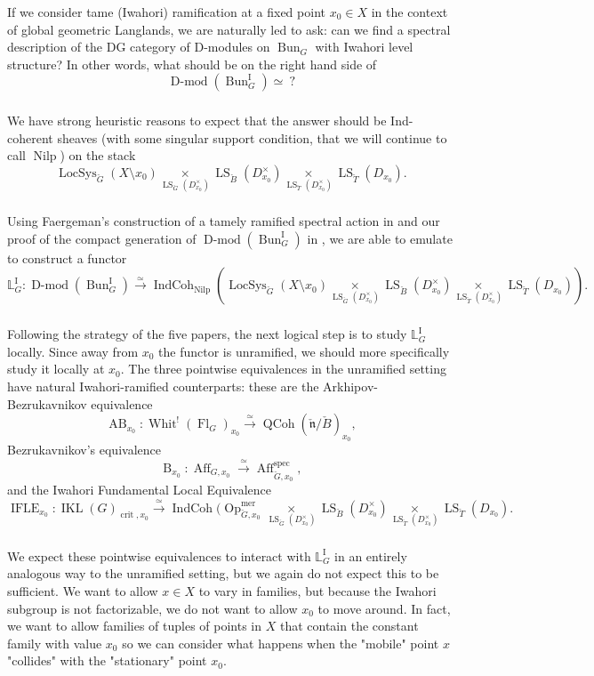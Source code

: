\documentclass[10pt]{amsart}
\theoremstyle{remark}
\newcommand{\on}[1]{\operatorname{#1}}
\newcommand{\Bun}{\on{Bun}}
\newcommand{\Dmod}{\on{D-mod}}
\newcommand{\QCoh}{\on{QCoh}}
\newcommand{\IndCoh}{\on{IndCoh}}
\newcommand{\IKLx}{\on{IKL}(G)_{\on{crit}, x_0}}
\newcommand{\Gcheck}{\check{G}}
\newcommand{\ncheck}{\check{\mathfrak{n}}}
\newcommand{\Bcheck}{\check{B}}
\newcommand{\Tcheck}{\check{T}}
\newcommand{\sssec}[1]{\subsubsection{}}
\begin{document}
\sssec{}
If we consider tame (Iwahori) ramification at a fixed point $x_0 \in X$ in the context of global geometric Langlands, we are naturally led to ask: can we find a spectral description of the DG category of D-modules on $\Bun_G$ with Iwahori level structure? In other words, what should be on the right hand side of 
$$
\Dmod(\Bun_G^{\on{I}}) \simeq \ ?
$$

\sssec{}
We have strong heuristic reasons to expect that the answer should be Ind-coherent sheaves (with some singular support condition, that we will continue to call $\on{Nilp}$) on the stack
$$
\on{LocSys}_{\Gcheck}(X \setminus x_0) \underset{\on{LS}_{\Gcheck}(D_{x_0}^{\times})}{\times} \on{LS}_{\Bcheck}(D_{x_0}^{\times}) \underset{\on{LS}_{\Tcheck}(D_{x_0}^{\times})}{\times} \on{LS}_{\Tcheck}(D_{x_0}).
$$

\sssec{}
Using Faergeman's construction of a tamely ramified spectral action in \cite{Fae} and our proof of the compact generation of $\Dmod(\Bun_G^{\on{I}})$ in \cite{Nam}, we are able to emulate \cite{GLC1} to construct a functor
$$
\mathbb{L}_G^{\on{I}} : \Dmod(\Bun_G^{\on{I}}) \overset{\simeq}{\longrightarrow} \IndCoh_{\on{Nilp}}(\on{LocSys}_{\Gcheck}(X \setminus x_0) \underset{\on{LS}_{\Gcheck}(D_{x_0}^{\times})}{\times} \on{LS}_{\Bcheck}(D_{x_0}^{\times}) \underset{\on{LS}_{\Tcheck}(D_{x_0}^{\times})}{\times} \on{LS}_{\Tcheck}(D_{x_0})).
$$

\sssec{}
Following the strategy of the five papers, the next logical step is to study $\mathbb{L}_G^{\on{I}}$ locally. Since away from $x_0$ the functor is unramified, we should more specifically study it locally at $x_0$. The three pointwise equivalences in the unramified setting have natural Iwahori-ramified counterparts:
these are the Arkhipov-Bezrukavnikov equivalence
$$
\on{AB}_{x_0} : \on{Whit}^!(\on{Fl}_G)_{x_0} \overset{\simeq}{\longrightarrow} \QCoh(\ncheck/\Bcheck)_{x_0},
$$
Bezrukavnikov's equivalence
$$
\on{B}_{x_0} : \on{Aff}_{G, x_0} \overset{\simeq}{\longrightarrow} \on{Aff}_{\Gcheck, x_0}^{\on{spec}},
$$
and the Iwahori Fundamental Local Equivalence
$$
\on{IFLE}_{x_0} : \IKLx \overset{\simeq}{\longrightarrow} \IndCoh(\on{Op}_{\Gcheck, x_0}^{\on{mer}} \underset{\on{LS}_{\Gcheck}(D_{x_0}^{\times})}{\times} \on{LS}_{\Bcheck}(D_{x_0}^{\times}) \underset{\on{LS}_{\Tcheck}(D_{x_0}^{\times})}{\times} \on{LS}_{\Tcheck}(D_{x_0}).
$$

\sssec{}
We expect these pointwise equivalences to interact with $\mathbb{L}_G^{\on{I}}$ in an entirely analogous way to the unramified setting, but we again do not expect this to be sufficient. We want to allow $x \in X$ to vary in families, but because the Iwahori subgroup is not factorizable, we do not want to allow $x_0$ to move around. In fact, we want to allow families of tuples of points in $X$ that contain the constant family with value $x_0$ so we can consider what happens when the "mobile" point $x$ "collides" with the "stationary" point $x_0$.
\end{document}
